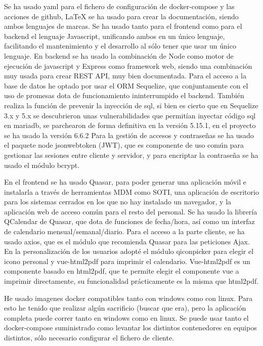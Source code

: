 \documentclass[11pt,spanish,listoffigures,listoftables]{tfgetsinf}
\begin{document}
Se ha usado yaml para el fichero de configuración de docker-compose y las acciones de github, \LaTeX{} se ha usado para crear la documentación, siendo ambos lenguajes de marcas.
Se ha usado tanto para el frontend como para el backend el lenguaje Javascript, unificando ambos en un único lenguaje, facilitando el mantenimiento y el desarrollo al sólo tener que usar un único lenguaje.
En backend se ha usado la combinación de Node como motor de ejecución de javascript y Express como framework web, siendo una combinación muy usada para crear REST API, muy bien documentada.
Para el acceso a la base de datos he optado por usar el ORM Sequelize, que conjuntamente con el uso de promesas dota de funcionamiento ininterrumpido el backend. 
También realiza la función de prevenir la inyección de sql, si bien es cierto que en Sequelize 3.x y 5.x se descubrieron unas vulnerabilidades que permitían inyectar código sql en mariadb, se parchearon de forma definitiva en la versión 5.15.1, en el proyecto se ha usado la versión 6.6.2
Para la gestión de accesos y contraseñas se ha usado el paquete node jsonwebtoken (JWT), que es componente de uso común para gestionar las sesiones entre cliente y servidor, y para encriptar la contraseña se ha usado el módulo bcrypt.

En el frontend se ha usado Quasar, para poder generar una aplicación móvil e instalarla a través de herramientas MDM como SOTI, una aplicación de escritorio para los sistemas cerrados en los que no hay instalado un navegador, y la aplicación web de acceso común para el resto del personal.
Se ha usado la librería QCalendar de Quasar, que dota de funciones de fecha/hora, así como un interfaz de calendario mensual/semanal/diario.
Para el acceso a la parte cliente, se ha usado axios, que es el módulo que recomienda Quasar para las peticiones Ajax.
En la personalización de los usuarios adopté el módulo qiconpicker para elegir el icono personal y vue-html2pdf para imprimir el calendario. Vue-html2pdf es un componente basado en html2pdf, que te permite elegir el componente vue a imprimir directamente, su funcionalidad prácticamente es la misma que html2pdf.

He usado imagenes docker compatibles tanto con windows como con linux. Para esto he tenido que realizar algún sacrificio (buscar que era), pero la aplicación completa puede correr tanto en windows como en linux.
Se puede usar tanto el docker-compose suministrado como levantar los distintos contenedores en equipos distintos, sólo necesario configurar el fichero de cliente.
\end{document}
